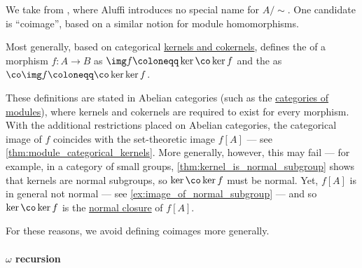 \begin{remark}\label{rem:categorical_image_and_coimage}
  We take  from \cite[thm. I.2.7]{Aluffi2009Algebra}, where Aluffi introduces no special name for \( A / {\sim} \). One candidate is \enquote{coimage}, based on a similar notion for module homomorphisms.

  Most generally, based on categorical \hyperref[def:categorical_kernels]{kernels and cokernels}, \textcite[def. IX.1.15]{Aluffi2009Algebra} defines the  of a morphism \( f: A \to B \) as \( \img f \coloneqq \ker \co\ker f \) and the  as \( \co\img f \coloneqq \co\ker \ker f \).

  These definitions are stated in Abelian categories (such as the \hyperref[def:module/category]{categories of modules}), where kernels and cokernels are required to exist for every morphism. With the additional restrictions placed on Abelian categories, the categorical image of \( f \) coincides with the set-theoretic image \( f[A] \) --- see \cref{thm:module_categorical_kernels}. More generally, however, this may fail --- for example, in a category of small groups, \cref{thm:kernel_is_normal_subgroup} shows that kernels are normal subgroups, so \( \ker \co\ker f \) must be normal. Yet, \( f[A] \) is in general not normal --- see \cref{ex:image_of_normal_subgroup} --- and so \( \ker \co\ker f \) is the \hyperref[def:normal_closure]{normal closure} of \( f[A] \).

  For these reasons, we avoid defining coimages more generally.
\end{remark}

\paragraph{\( \omega \) recursion}

